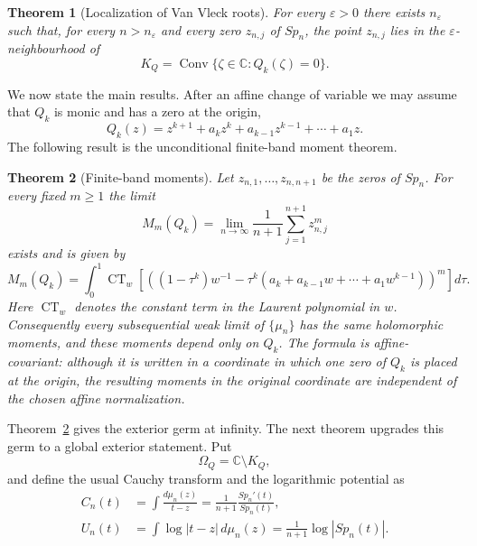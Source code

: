 \documentclass[10pt,twoside,a4paper,reqno]{amsart}
\theoremstyle{plain}
\newtheorem{theo}           {Theorem}
\theoremstyle{definition}
\theoremstyle{remark}
\newenvironment{theorem}{\begin{theo}}{\end{theo}}
\newcommand {\CT} {\operatorname {CT}}
\DeclareMathOperator{\Conv}{Conv}
\begin{document}
\begin{theorem}[Localization of Van Vleck roots]\label{th:loc}
For every $\varepsilon>0$ there exists $n_\varepsilon$ such that, for every
$n>n_\varepsilon$ and every zero $z_{n,j}$ of $Sp_n$, the point $z_{n,j}$ lies in
the $\varepsilon$-neighbourhood of
\[
        K_Q=\Conv\{\zeta\in\mathbb C:Q_k(\zeta)=0\} .
\]
\end{theorem}

We now state the main results.  After an affine change of variable we may assume
that $Q_k$ is monic and has a zero at the origin,
\[
        Q_k(z)=z^{k+1}+a_kz^k+a_{k-1}z^{k-1}+\cdots+a_1z .
\]
The following result is the unconditional finite-band moment theorem.  

\begin{theorem}[Finite-band moments]\label{th:1}
Let $z_{n,1},\ldots,z_{n,n+1}$ be the zeros of $Sp_n$.  For every fixed
$m\ge1$ the limit
\[
        M_m(Q_k)=\lim_{n\to\infty}\frac1{n+1}\sum_{j=1}^{n+1} z_{n,j}^m
\]
exists and is given by
\begin{equation}\label{eq:moment-formula}
        M_m(Q_k)=\int_0^1
        \CT_w\left[
        \left((1-\tau^k)w^{-1}
        -\tau^k(a_k+a_{k-1}w+\cdots+a_1w^{k-1})\right)^m
        \right]d\tau .
\end{equation}
Here $\CT_w$ denotes the constant term in the Laurent polynomial in $w$.
Consequently every subsequential weak limit of $\{\mu_n\}$ has the same
holomorphic moments, and these moments depend only on $Q_k$.
The formula is affine-covariant: although it is written in a coordinate in which
one zero of $Q_k$ is placed at the origin, the resulting moments in the original
coordinate are independent of the chosen affine normalization.
\end{theorem}

Theorem~\ref{th:1} gives the exterior germ at infinity.  The next theorem
upgrades this germ to a global exterior statement.  Put
\[
        \Omega_Q=\mathbb C\setminus K_Q,
\]
and define the usual Cauchy transform and the logarithmic potential as 
\begin{align*}
        C_n(t)&=\int\frac{d\mu_n(z)}{t-z}
        =\frac1{n+1}\frac{Sp_n'(t)}{Sp_n(t)},\\
        U_n(t)&=\int\log|t-z|\,d\mu_n(z)
        =\frac1{n+1}\log|Sp_n(t)| .
\end{align*}
\end{document}
